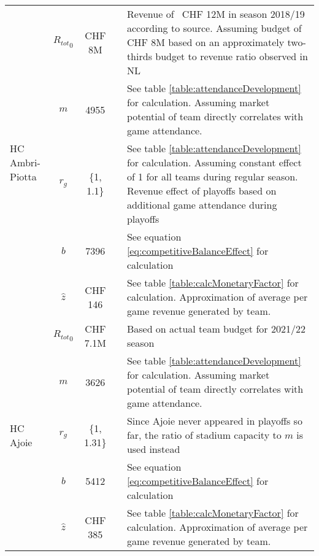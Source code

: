 \begin{longtable}[h!]{p{1.5cm}cc>{\baselineskip=13pt}p{3cm}>{\baselineskip=13pt}p{5.5cm}}
    \multirow[t]{5}{=}{HC Ambri-Piotta} & ${R_{tot}}_{0}$ & CHF 8M & \cite{giraldi_ambri_2019} &                            Revenue of ~CHF 12M in season 2018/19 according to source. Assuming budget of CHF 8M based on an approximately two-thirds budget to revenue ratio observed in NL\\
                                        & $m$ & 4955 & \cite{national_league_zuschauerzahlen_2022} & See table \ref{table:attendanceDevelopment} for calculation. Assuming market potential of team directly correlates with game attendance. \\
                                        & $r_g$ & \{1, 1.1\} & \cite{national_league_zuschauerzahlen_2022} & See table \ref{table:attendanceDevelopment} for calculation. Assuming constant effect of 1 for all teams during regular season. Revenue effect of playoffs based on additional game attendance during playoffs \\
                                        & $b$ & 7396 &  & See equation \ref{eq:competitiveBalanceEffect} for calculation \\
                                        & $\hat{z}$ & CHF 146 &  & See table \ref{table:calcMonetaryFactor} for calculation. Approximation of average per game revenue generated by team. \\
    \midrule
    
    \multirow[t]{5}{=}{HC Ajoie} & ${R_{tot}}_{0}$ & CHF 7.1M & \cite{kouyoumdjian_president_2022}                            & Based on actual team budget for 2021/22 season\\ 
                                & $m$ & 3626 & \cite{national_league_zuschauerzahlen_2022} & See table \ref{table:attendanceDevelopment} for calculation. Assuming market potential of team directly correlates with game attendance. \\
                                & $r_g$ & \{1, 1.31\} & \cite{national_league_zuschauerzahlen_2022} & Since Ajoie never appeared in playoffs so far, the ratio of stadium capacity to $m$ is used instead \\
                                & $b$ & 5412 &  & See equation \ref{eq:competitiveBalanceEffect} for calculation \\
                                & $\hat{z}$ & CHF 385 &  & See table \ref{table:calcMonetaryFactor} for calculation. Approximation of average per game revenue generated by team. \\
    \midrule
    

\end{longtable}
